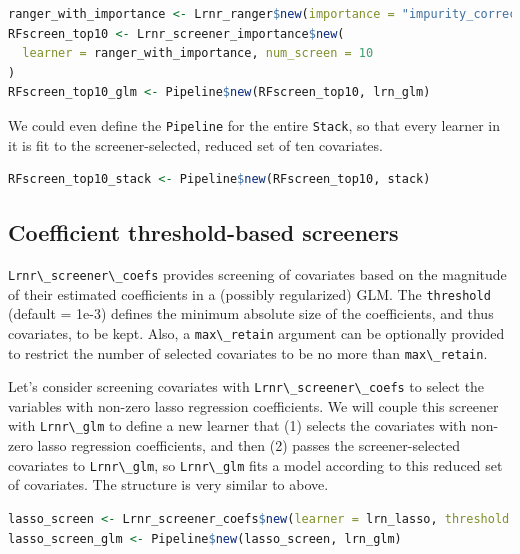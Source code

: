\documentclass[
  12pt, krantz2,
]{krantz}
\newcommand{\passthrough}[1]{#1}
\newcommand{\1}{\mathbbm{1}}
\theoremstyle{definition}
\theoremstyle{definition}
\theoremstyle{definition}
\theoremstyle{definition}
\theoremstyle{remark}
\begin{document}
\begin{lstlisting}[language=R]
ranger_with_importance <- Lrnr_ranger$new(importance = "impurity_corrected")
RFscreen_top10 <- Lrnr_screener_importance$new(
  learner = ranger_with_importance, num_screen = 10
)
RFscreen_top10_glm <- Pipeline$new(RFscreen_top10, lrn_glm)
\end{lstlisting}

We could even define the \passthrough{\lstinline!Pipeline!} for the entire \passthrough{\lstinline!Stack!}, so that every
learner in it is fit to the screener-selected, reduced set of ten covariates.

\begin{lstlisting}[language=R]
RFscreen_top10_stack <- Pipeline$new(RFscreen_top10, stack)
\end{lstlisting}

\hypertarget{coefficient-threshold-based-screeners}{%
\subsection{Coefficient threshold-based screeners}\label{coefficient-threshold-based-screeners}}

\passthrough{\lstinline!Lrnr\_screener\_coefs!} provides screening of covariates based on the magnitude
of their estimated coefficients in a (possibly regularized) GLM. The
\passthrough{\lstinline!threshold!} (default = 1e-3) defines the minimum absolute size of the
coefficients, and thus covariates, to be kept. Also, a \passthrough{\lstinline!max\_retain!} argument
can be optionally provided to restrict the number of selected covariates to be
no more than \passthrough{\lstinline!max\_retain!}.

Let's consider screening covariates with \passthrough{\lstinline!Lrnr\_screener\_coefs!} to select the
variables with non-zero lasso regression coefficients. We will couple this
screener with \passthrough{\lstinline!Lrnr\_glm!} to define a new learner that (1) selects the covariates
with non-zero lasso regression coefficients, and then (2) passes the
screener-selected covariates to \passthrough{\lstinline!Lrnr\_glm!}, so \passthrough{\lstinline!Lrnr\_glm!} fits a model
according to this reduced set of covariates. The structure is very similar to
above.

\begin{lstlisting}[language=R]
lasso_screen <- Lrnr_screener_coefs$new(learner = lrn_lasso, threshold = 0)
lasso_screen_glm <- Pipeline$new(lasso_screen, lrn_glm)
\end{lstlisting}
\end{document}
